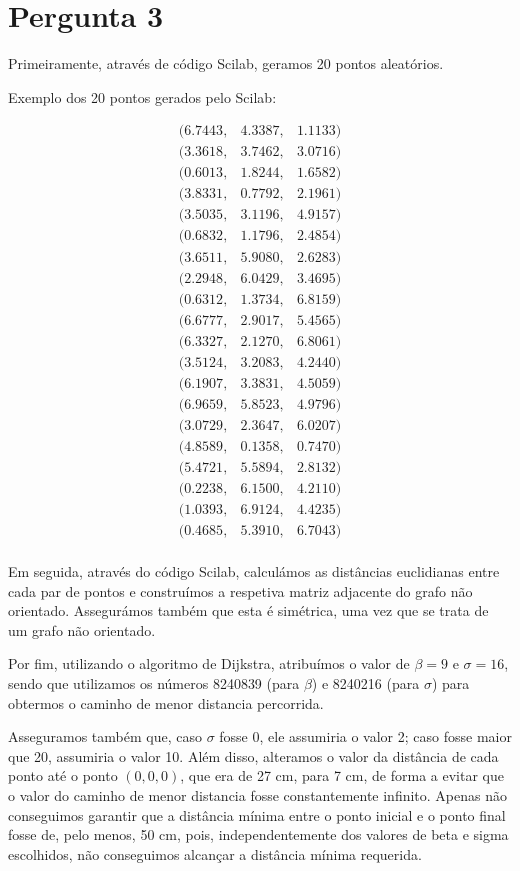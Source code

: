 \chapter{Pergunta 3}
Primeiramente, através de código Scilab, geramos 20 pontos aleatórios.

Exemplo dos 20 pontos gerados pelo Scilab:

\[
\begin{array}{ccc}
(6.7443, & 4.3387, & 1.1133) \\
(3.3618, & 3.7462, & 3.0716) \\
(0.6013, & 1.8244, & 1.6582) \\
(3.8331, & 0.7792, & 2.1961) \\
(3.5035, & 3.1196, & 4.9157) \\
(0.6832, & 1.1796, & 2.4854) \\
(3.6511, & 5.9080, & 2.6283) \\
(2.2948, & 6.0429, & 3.4695) \\
(0.6312, & 1.3734, & 6.8159) \\
(6.6777, & 2.9017, & 5.4565) \\
(6.3327, & 2.1270, & 6.8061) \\
(3.5124, & 3.2083, & 4.2440) \\
(6.1907, & 3.3831, & 4.5059) \\
(6.9659, & 5.8523, & 4.9796) \\
(3.0729, & 2.3647, & 6.0207) \\
(4.8589, & 0.1358, & 0.7470) \\
(5.4721, & 5.5894, & 2.8132) \\
(0.2238, & 6.1500, & 4.2110) \\
(1.0393, & 6.9124, & 4.4235) \\
(0.4685, & 5.3910, & 6.7043) \\
\end{array}
\]

Em seguida, através do código Scilab, calculámos as distâncias euclidianas entre cada par de pontos e construímos a respetiva matriz adjacente do grafo não orientado. Assegurámos também que esta é simétrica, uma vez que se trata de um grafo não orientado.


Por fim, utilizando o algoritmo de Dijkstra, atribuímos o valor de $\beta = 9$ e $\sigma = 16$, sendo que utilizamos os números 8240839 (para $\beta$) e 8240216 (para $\sigma$) para obtermos o caminho de menor distancia percorrida.

Asseguramos também que, caso $\sigma$ fosse 0, ele assumiria o valor 2; caso fosse maior que 20, assumiria o valor 10. Além disso, alteramos o valor da distância de cada ponto até o ponto $(0,0,0)$, que era de 27 cm, para 7 cm, de forma a evitar que o valor do caminho de menor distancia fosse constantemente infinito. Apenas não conseguimos garantir que a distância mínima entre o ponto inicial e o ponto final fosse de, pelo menos, 50 cm, pois, independentemente dos valores de beta e sigma escolhidos, não conseguimos alcançar a distância mínima requerida.



